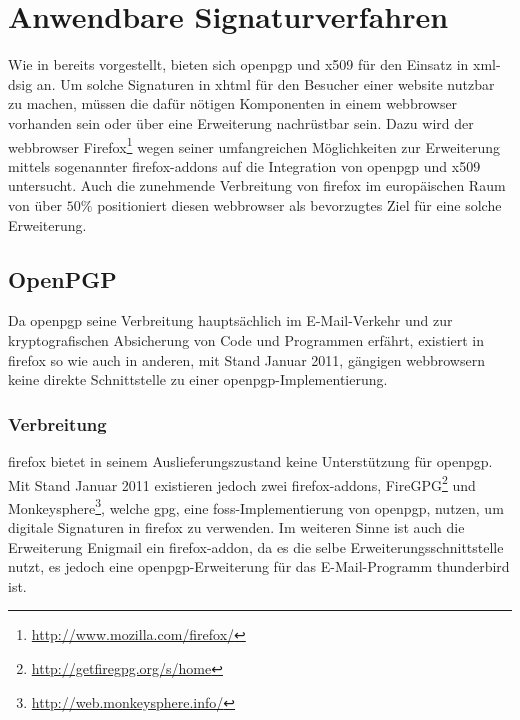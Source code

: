 

\chapter{Anwendbare Signaturverfahren}
\label{chap:Signaturverfahren}
Wie in  bereits vorgestellt, bieten sich \gls{openpgp} und \gls{x509} für den Einsatz in
\gls{xml-dsig} an. Um solche Signaturen in \gls{xhtml} für den Besucher einer \gls{website} nutzbar zu machen, müssen die dafür nötigen Komponenten in einem
\gls{webbrowser} vorhanden sein oder über eine Erweiterung nachrüstbar sein. Dazu wird der \gls{webbrowser}
Firefox\footnote{\url{http://www.mozilla.com/firefox/}} wegen seiner umfangreichen Möglichkeiten zur Erweiterung mittels sogenannter
\glspl{firefox-addon} auf die Integration von \gls{openpgp} und \gls{x509} untersucht. Auch die zunehmende Verbreitung von \gls{firefox} im europäischen Raum
von über $50\%$ \cite{firefox-verbreitung} positioniert diesen \gls{webbrowser} als bevorzugtes Ziel für eine solche Erweiterung.

\section{OpenPGP}
\label{sec:Signaturverfahren:OpenPGP}
Da \gls{openpgp} seine Verbreitung hauptsächlich im E-Mail-Verkehr \cite{2719799020071101} und zur kryptografischen Absicherung von Code und Programmen erfährt,
existiert in \gls{firefox} so wie auch in anderen, mit Stand Januar 2011, gängigen \gls{webbrowser}n keine direkte Schnittstelle zu einer
\gls{openpgp}-Implementierung.

\subsection{Verbreitung}
\gls{firefox} bietet in seinem Auslieferungszustand keine Unterstützung für \gls{openpgp}. Mit Stand Januar 2011 existieren jedoch zwei \glspl{firefox-addon},
FireGPG\footnote{\url{http://getfiregpg.org/s/home}} und
Monkeysphere\footnote{\url{http://web.monkeysphere.info/}}, welche \gls{gpg}, eine \gls{foss}-Implementierung von \gls{openpgp},
nutzen, um digitale Signaturen in \gls{firefox} zu verwenden. Im weiteren Sinne ist auch die Erweiterung Enigmail ein \gls{firefox-addon}, da es die selbe
Erweiterungsschnittstelle nutzt, es jedoch eine \gls{openpgp}-Erweiterung für das E-Mail-Programm \gls{thunderbird} ist.

